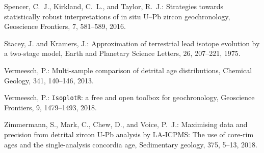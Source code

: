 \documentclass[gchron, manuscript]{copernicus}
\begin{document}
\begin{thebibliography}{14}
Spencer, C.~J., Kirkland, C.~L., and Taylor, R.~J.: {Strategies towards
  statistically robust interpretations of in situ U--Pb zircon geochronology},
  Geoscience Frontiers, 7, 581--589, 2016.

Stacey, J. and Kramers, J.: Approximation of terrestrial lead isotope evolution
  by a two-stage model, Earth and Planetary Science Letters, 26, 207--221,
  1975.

Vermeesch, P.: Multi-sample comparison of detrital age distributions, Chemical
  Geology, 341, 140--146, 2013.

Vermeesch, P.: {\texttt{IsoplotR}: a free and open toolbox for geochronology},
  Geoscience Frontiers, 9, 1479--1493, 2018.

Zimmermann, S., Mark, C., Chew, D., and Voice, P.~J.: {Maximising data and
  precision from detrital zircon U-Pb analysis by LA-ICPMS: The use of core-rim
  ages and the single-analysis concordia age}, Sedimentary geology, 375, 5--13,
  2018.

\end{thebibliography}








\end{document}
